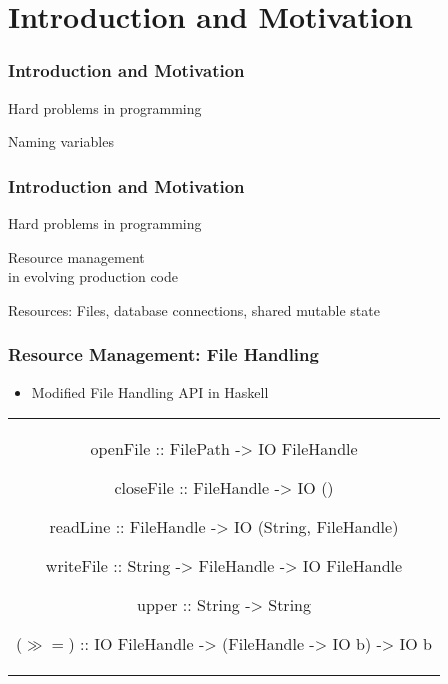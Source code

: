 \section{Introduction and Motivation}\label{sec:introduction}

\begin{frame}[c]
  \frametitle{Introduction and Motivation}
  {\large
    \begin{center}
      Hard problems in programming

      {\LARGE \color{red}Naming variables}
    \end{center}
    }
\end{frame}

\begin{frame}
  \frametitle{Introduction and Motivation}
  \begin{center}
    {\large Hard problems in programming}

    {\LARGE \color{red}Resource management}
    \\{\normalsize  in evolving production code}

    {\normalsize Resources: Files, database connections, shared mutable state}
\end{center}
\end{frame}

\begin{frame}[fragile, c]
  \frametitle{Resource Management: File Handling}
  \begin{center}
    \begin{itemize}
    \item Modified File Handling API in Haskell
    \end{itemize}
    \begin{tabular}[h]{c}
      \begin{haskell}

     openFile   :: FilePath   -> IO FileHandle

     closeFile  :: FileHandle -> IO ()

     readLine   :: FileHandle -> IO (String, FileHandle)

     writeFile  :: String     -> FileHandle
                             -> IO FileHandle


     upper      :: String     -> String

     ($\gg\!=$) :: IO FileHandle -> (FileHandle -> IO b) -> IO b
      \end{haskell}
    \end{tabular}
\end{center}
\end{frame}

